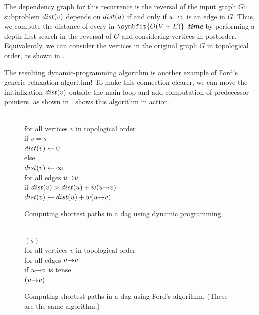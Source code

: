 The dependency graph for this recurrence is the reversal of the input graph $G$: subproblem $dist(v)$ depends on $dist(u)$ if and only if $u\mathord{\rightarrow}v$ is an edge in $G$.
Thus, we compute the distance of every in \textbf{\textit{$\symbfit{O(V + E)}$ time}} by performing a depth-first search in the reversal of $G$ and considering vertices in postorder.
Equivalently, we can consider the vertices in the original graph $G$ in topological order, as shown in .

The resulting dynamic-programming algorithm is another example of Ford’s generic relaxation algorithm!
To make this connection clearer, we can move the initialization $dist(v)$ outside the main loop and add computation of predecessor pointers, as shown in .
 shows this algorithm in action.

\begin{figure}[ht]
\centering
\begin{pseudocode}
\\
for all vertices $v$ in topological order\\
\Indent if $v = s$\\
\Indent\Indent $dist(v) \gets 0$\\
\Indent else\\
\Indent\Indent $dist(v) \gets \infty$\\
\Indent\Indent for all edges $u\mathord{\rightarrow}v$\\
\Indent\Indent\Indent if $dist(v) > dist(u) + w(u\mathord{\rightarrow}v)$ \\
\Indent\Indent\Indent\Indent $dist(v) \gets dist(u) + w(u\mathord{\rightarrow}v)$ 
\end{pseudocode}
\caption{Computing shortest paths in a dag using dynamic programming}
\label{fig:8.7}
\end{figure}

\begin{figure}[ht]
\centering
\begin{pseudocode}
\\
$(s)$\\
for all vertices $v$ in topological order\\
\Indent for all edges $u\mathord{\rightarrow}v$\\
\Indent\Indent if $u\mathord{\rightarrow}v$ is tense\\
\Indent\Indent\Indent {}$(u\mathord{\rightarrow}v)$
\end{pseudocode}
\caption{Computing shortest paths in a dag using Ford’s algorithm. (These are the same algorithm.)}
\label{fig:8.8}
\end{figure}

